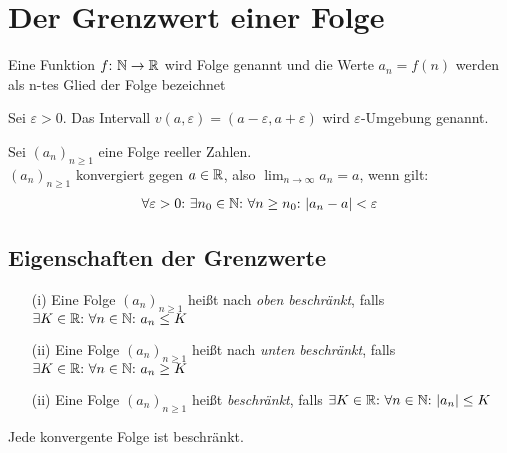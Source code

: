 \section{Der Grenzwert einer Folge}

\begin{frameddefn}[Folge]
	Eine Funktion $f{:}\  \mathbb{N} \to \mathbb{R}$ wird Folge genannt und die Werte $a_n = f(n)$ werden als n-tes Glied der Folge bezeichnet
\end{frameddefn}

\begin{frameddefn}
	Sei $\varepsilon > 0$. Das Intervall $v(a, \varepsilon) = (a-\varepsilon, a+\varepsilon)$ wird $\varepsilon$-Umgebung genannt.
\end{frameddefn}

\begin{frameddefn}
	Sei $(a_n)_{n\geq1}$ eine Folge reeller Zahlen.\\ $(a_n)_{n \geq 1}$ konvergiert gegen $a \in \mathbb{R}$, also $\lim_{n \to \infty} a_n = a$, wenn gilt:
	\begin{align*}
		\forall \varepsilon > 0{:}\  \exists n_0 \in \mathbb{N}{:}\  \forall n \geq n_0{:}\  |a_n - a| < \varepsilon
	\end{align*}
\end{frameddefn}

\subsection{Eigenschaften der Grenzwerte}

\begin{frameddefn}[Beschränktheit]
	\begin{enumerate}
		\item [(i)] Eine Folge $(a_n)_{n\geq 1}$ heißt nach \textit{oben beschränkt}, falls $\exists K \in \mathbb{R}{:}\  \forall n \in \mathbb{N}{:}\  a_n \leq K$
		\item [(ii)] Eine Folge $(a_n)_{n\geq 1}$ heißt nach \textit{unten beschränkt}, falls $\exists K \in \mathbb{R}{:}\  \forall n \in \mathbb{N}{:}\  a_n \geq K$
		\item [(ii)] Eine Folge $(a_n)_{n\geq 1}$ heißt \textit{beschränkt}, falls $\exists K \in \mathbb{R}{:}\  \forall n \in \mathbb{N}{:}\  |a_n| \leq K$
	\end{enumerate}
\end{frameddefn}

\begin{framedthm}
	Jede konvergente Folge ist beschränkt.
\end{framedthm}

